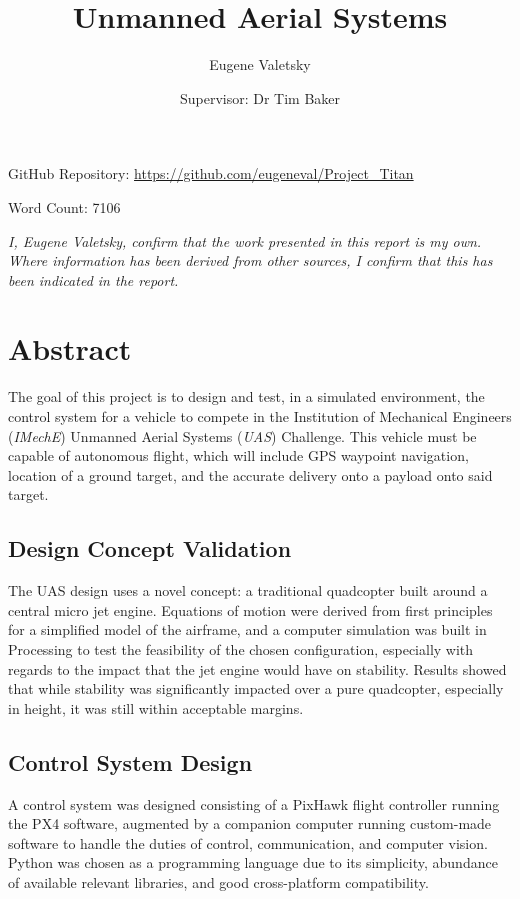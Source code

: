 \documentclass[11pt]{article}
\author{Eugene Valetsky\\ \and Supervisor: Dr Tim Baker}
\title{Unmanned Aerial Systems}
\begin{document}
\maketitle

\begin{center}
    GitHub Repository: \url{https://github.com/eugeneval/Project_Titan}

    \vspace{2em}
    Word Count: 7106

    \vspace{6em}
    \emph{I, Eugene Valetsky, confirm that the work presented in this report is my own. Where information has been derived from other sources, I confirm that this has been indicated in the report.}
\end{center}

\newpage
\tableofcontents
\listoffigures
\newpage



\section{Abstract}
The goal of this project is to design and test, in a simulated environment, the control system for a vehicle to compete in the Institution of Mechanical Engineers (\emph{IMechE}) Unmanned Aerial Systems (\emph{UAS}) Challenge. This vehicle must be capable of autonomous flight, which will include GPS waypoint navigation, location of a ground target, and the accurate delivery onto a payload onto said target\cite{IMechE_rules}.

\subsection*{Design Concept Validation}
The UAS design uses a novel concept: a traditional quadcopter built around a central micro jet engine\cite{Ismail_paper}. Equations of motion were derived from first principles for a simplified model of the airframe, and a computer simulation was built in Processing\cite{processing} to test the feasibility of the chosen configuration, especially with regards to the impact that the jet engine would have on stability. Results showed that while stability was significantly impacted over a pure quadcopter, especially in height, it was still within acceptable margins.

\subsection*{Control System Design}
A control system was designed consisting of a PixHawk flight controller running the PX4 software\cite{PX4_user_guide}, augmented by a companion computer running custom-made software to handle the duties of control, communication, and computer vision. Python\cite{python} was chosen as a programming language due to its simplicity, abundance of available relevant libraries, and good cross-platform compatibility.
\end{document}
